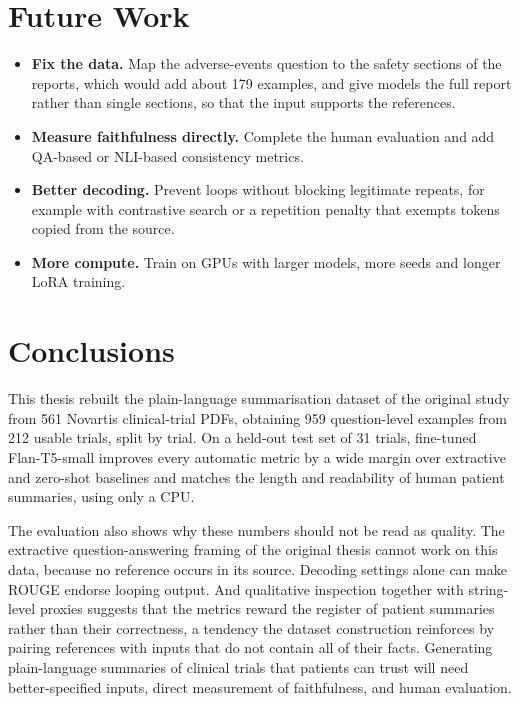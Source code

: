 \section{Future Work}
\label{sec:future}

\begin{itemize}
    \item \textbf{Fix the data.} Map the adverse-events question to the safety sections of the reports, which would add about 179 examples, and give models the full report rather than single sections, so that the input supports the references.
    \item \textbf{Measure faithfulness directly.} Complete the human evaluation and add QA-based \parencite{wang2020qags} or NLI-based \parencite{laban2022summac} consistency metrics.
    \item \textbf{Better decoding.} Prevent loops without blocking legitimate repeats, for example with contrastive search \parencite{su2022contrastive} or a repetition penalty that exempts tokens copied from the source.
    \item \textbf{More compute.} Train on GPUs with larger models, more seeds and longer LoRA training.
\end{itemize}

\section{Conclusions}

This thesis rebuilt the plain-language summarisation dataset of the original study from 561 Novartis clinical-trial PDFs, obtaining 959 question-level examples from 212 usable trials, split by trial. On a held-out test set of 31 trials, fine-tuned Flan-T5-small improves every automatic metric by a wide margin over extractive and zero-shot baselines and matches the length and readability of human patient summaries, using only a CPU.

The evaluation also shows why these numbers should not be read as quality. The extractive question-answering framing of the original thesis cannot work on this data, because no reference occurs in its source. Decoding settings alone can make ROUGE endorse looping output. And qualitative inspection together with string-level proxies suggests that the metrics reward the register of patient summaries rather than their correctness, a tendency the dataset construction reinforces by pairing references with inputs that do not contain all of their facts. Generating plain-language summaries of clinical trials that patients can trust will need better-specified inputs, direct measurement of faithfulness, and human evaluation.
